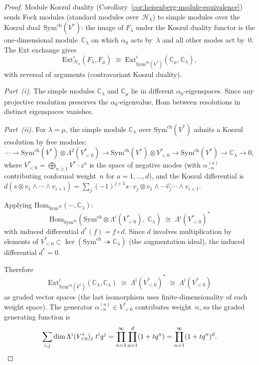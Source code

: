 \begin{proof}
Module Koszul duality
(Corollary~\ref{cor:heisenberg-module-equivalence}) sends
Fock modules (standard modules over~$\mathcal{H}_k$) to
simple modules over the Koszul dual~$\mathrm{Sym}^{\mathrm{ch}}(V^*)$:
the image of $F_\lambda$ under the Koszul duality functor is the
one-dimensional module~$\mathbb{C}_\lambda$ on which $\alpha_0$ acts
by~$\lambda$ and all other modes act by~$0$. The Ext exchange gives
\begin{equation}\label{eq:fock-ext-exchange}
\mathrm{Ext}^i_{\mathcal{H}_k}(F_\lambda, F_\mu)
\;\cong\;
\mathrm{Ext}^i_{\mathrm{Sym}^{\mathrm{ch}}(V^*)}
(\mathbb{C}_\mu, \mathbb{C}_\lambda),
\end{equation}
with reversal of arguments (contravariant Koszul duality).

\emph{Part~(i).}
The simple modules $\mathbb{C}_\lambda$ and $\mathbb{C}_\mu$ lie in
different $\alpha_0$-eigenspaces. Since any projective resolution
preserves the $\alpha_0$-eigenvalue, $\mathrm{Hom}$ between
resolutions in distinct eigenspaces vanishes.

\emph{Part~(ii).}
For $\lambda = \mu$, the simple module $\mathbb{C}_\lambda$ over
$\mathrm{Sym}^{\mathrm{ch}}(V^*)$ admits a Koszul resolution by
free modules:
\[
\cdots \to \mathrm{Sym}^{\mathrm{ch}}(V^*) \otimes \Lambda^2(V^*_{<0})
\to \mathrm{Sym}^{\mathrm{ch}}(V^*) \otimes V^*_{<0}
\to \mathrm{Sym}^{\mathrm{ch}}(V^*) \to \mathbb{C}_\lambda \to 0,
\]
where $V^*_{<0} = \bigoplus_{n \geq 1} V^* \cdot z^n$ is the
space of negative modes (with $\alpha_{-n}^{(a)}$ contributing
conformal weight~$n$ for $a = 1, \ldots, d$), and the Koszul
differential is
$d(s \otimes v_1 \wedge \cdots \wedge v_{i+1})
= \sum_j (-1)^{j+1} s \cdot v_j \otimes
v_1 \wedge \cdots \widehat{v_j} \cdots \wedge v_{i+1}$.

Applying $\mathrm{Hom}_{\mathrm{Sym}^{\mathrm{ch}}}
(-, \mathbb{C}_\lambda)$:
\[
\mathrm{Hom}_{\mathrm{Sym}^{\mathrm{ch}}}
(\mathrm{Sym}^{\mathrm{ch}} \otimes \Lambda^i(V^*_{<0}),\;
\mathbb{C}_\lambda)
\;\cong\; \Lambda^i(V^*_{<0})^*
\]
with induced differential $d^*(f) = f \circ d$. Since $d$ involves
multiplication by elements of $V^*_{<0} \subset
\ker(\mathrm{Sym}^{\mathrm{ch}} \twoheadrightarrow \mathbb{C}_\lambda)$
(the augmentation ideal), the induced differential $d^* = 0$.

Therefore
\[
\mathrm{Ext}^i_{\mathrm{Sym}^{\mathrm{ch}}(V^*)}
(\mathbb{C}_\lambda, \mathbb{C}_\lambda)
\;\cong\; \Lambda^i(V^*_{<0})^*
\;\cong\; \Lambda^i(V^*_{<0})
\]
as graded vector spaces (the last isomorphism uses
finite-dimensionality of each weight space).
The generator $\alpha_{-n}^{(a)} \in V^*_{<0}$ contributes weight~$n$,
so the graded generating function is
\[
\sum_{i,j} \dim \Lambda^i(V^*_{<0})_j\; t^i q^j
= \prod_{n=1}^{\infty}\prod_{a=1}^{d} (1 + t q^n)
= \prod_{n=1}^{\infty}(1 + tq^n)^d. \qedhere
\]
\end{proof}

